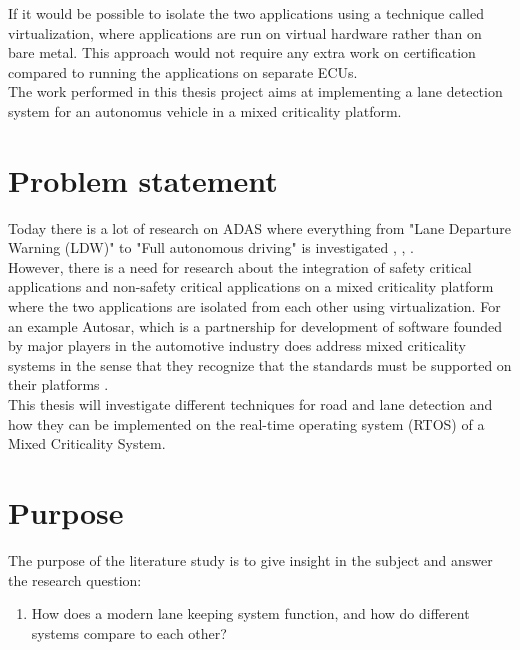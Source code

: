 If it would be possible to isolate the two applications using a technique called virtualization, where applications are run on virtual hardware rather than on bare metal. This approach would not require any extra work on certification compared to running the applications on separate ECUs.\\

The work performed in this thesis project aims at implementing a lane detection system for an autonomus vehicle in a mixed criticality platform. 

\section{Problem statement}
Today there is a lot of research on ADAS where everything from "Lane Departure Warning (LDW)" to "Full autonomous driving" is investigated \cite{BarHillel2014}, \cite{Yenikaya:2013:KVR:2522968.2522970}, \cite{mccall2006video}.\\

However, there is a need for research about the integration of safety critical applications and non-safety critical applications on a mixed criticality platform where the two applications are isolated from each other using virtualization. For an example Autosar, which is a partnership for development of software founded by major players in the automotive industry does address mixed criticality systems in the sense that they recognize that the standards must be supported on their platforms \cite{burns2013mixed} \cite{auto}.\\

This thesis will investigate different techniques for road and lane detection and how they can be implemented on the real-time operating system (RTOS) of a Mixed Criticality System. 


\section{Purpose}
The purpose of the literature study is to give insight in the subject and answer the research question:
\begin{enumerate}  
\item How does a modern lane keeping system function, and how do different systems compare to each other? %
\end{enumerate}

